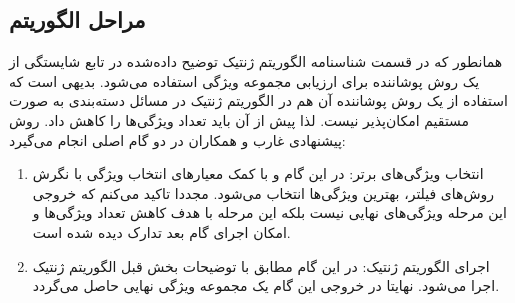\subsection{مراحل الگوریتم}
همانطور که در قسمت شناسنامه الگوریتم ژنتیک توضیح داده‌شده در تابع شایستگی از یک روش پوشاننده برای ارزیابی مجموعه ویژگی استفاده می‌شود. بدیهی است که استفاده از یک روش پوشاننده آن هم در الگوریتم ژنتیک در مسائل دسته‌بندی به صورت مستقیم امکان‌پذیر نیست. لذا پیش از آن باید تعداد ویژگی‌ها را کاهش داد. روش پیشنهادی غارب و همکاران در دو گام اصلی انجام می‌گیرد:
\begin{enumerate}
\item انتخاب ویژگی‌های برتر: در این گام و با کمک معیارهای انتخاب ویژگی با نگرش روش‌های فیلتر، بهترین ویژگی‌ها انتخاب می‌شود. مجددا تاکید می‌کنم که خروجی این مرحله ویژگی‌های نهایی نیست بلکه این مرحله با هدف کاهش تعداد ویژگی‌ها و امکان اجرای گام بعد تدارک دیده شده است.
\item اجرای الگوریتم ژنتیک: در این گام مطابق با توضیحات بخش قبل الگوریتم ژنتیک اجرا می‌شود. نهایتا در خروجی این گام یک مجموعه ویژگی نهایی حاصل می‌گردد.
\end{enumerate}